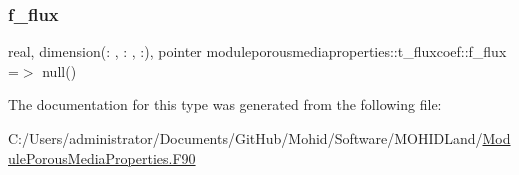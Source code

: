 \mbox{\label{structmoduleporousmediaproperties_1_1t__fluxcoef_afeaf890ff5b46a9efc08f77660bde6a5}} 
\subsubsection{\texorpdfstring{f\+\_\+flux}{f\_flux}}
{\footnotesize\ttfamily real, dimension(\+: , \+: , \+:), pointer moduleporousmediaproperties\+::t\+\_\+fluxcoef\+::f\+\_\+flux =$>$ null()\hspace{0.3cm}{\ttfamily [private]}}



The documentation for this type was generated from the following file\+:\begin{DoxyCompactItemize}
\item 
C\+:/\+Users/administrator/\+Documents/\+Git\+Hub/\+Mohid/\+Software/\+M\+O\+H\+I\+D\+Land/\mbox{\hyperlink{_module_porous_media_properties_8_f90}{Module\+Porous\+Media\+Properties.\+F90}}\end{DoxyCompactItemize}
